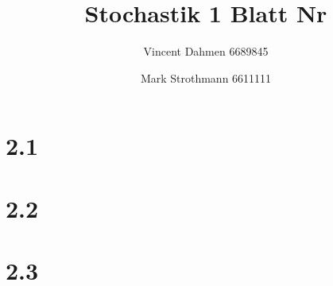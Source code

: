 \documentclass[12pt,a4paper]{article}
\title{Stochastik 1 Blatt Nr \Nr}
\author{Vincent Dahmen 6689845}
\author{Mark Strothmann 6611111}
\gdef\Nr{2}
\begin{document}
\maketitle{}


\section*{\Nr.1}

\newpage
\section*{\Nr.2}


\section*{\Nr.3}

\end{document}

